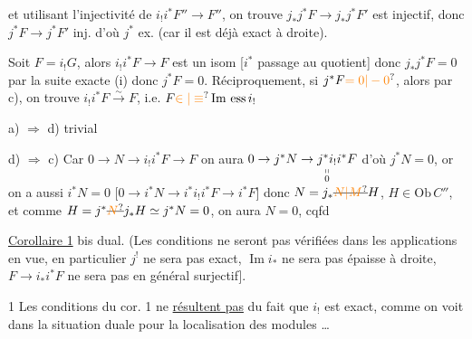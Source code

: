 \quad{}


et utilisant l'injectivité de $i_!i^*F''\to F''$, on trouve $j_*j^*F\to j_*j^*F'$ est injectif, donc $j^*F\to j^*F'$ inj. d'où $j^*$ ex. (car il est déjà exact à droite).

Soit $F=i_!G$, alors $i_!i^*F\to F$ est un isom [$i^*$ passage au quotient] donc $j_*j^*F=0$  par la suite exacte (i) donc $j^*F=0$. Réciproquement, si $j^*F\unsure{=0|-0}$, alors par c), on trouve $i_!i^*F\xrightarrow{\sim}F$, i.e. $F\unsure{\in|\equiv}\operatorname{Im}\,\mathrm{ess}\,i_!$




a) $\Rightarrow$ d) trivial

d) $\Rightarrow$ c) Car  $0\to N\to i_!i^*F\to F$ on aura  $0\to j^*N\to\underset{\substack{\shortparallel\\0}}{j^*i_!}i^*F$  d'où $j^*N=0$, or on a  aussi $i^*N=0$ [$0\to i^*N\to i^*i_!i^*F\to i^*F$] donc $N=j_*\deleted{\unsure{N|M}}H$, $H\in\mathrm{Ob}\,C''$, et comme $H=j^*\deleted{\unsure{N}}j_*H\simeq j^*N=0$, on aura $N=0$, cqfd


\uline{Corollaire 1} bis dual. (Les conditions  ne seront pas vérifiées dans les applications en vue, en particulier $j^!$ ne sera pas exact, $\operatorname{Im}i_*$ ne sera pas épaisse à droite, $F\to i_*i^*F$ ne sera pas en général surjectif].

\uline{} 1  Les conditions du cor. 1 ne \uline{résultent pas} du fait que $i_!$ est exact, comme on voit dans la situation duale pour la localisation des modules \ldots

